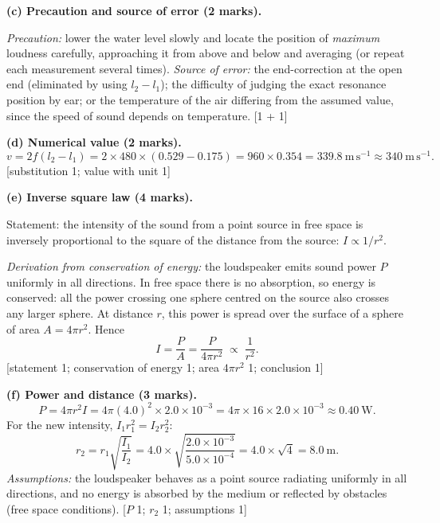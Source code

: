 \documentclass[11pt]{article}
\begin{document}
\begin{corrige}
\textbf{(c) Precaution and source of error (2 marks).}\par
\emph{Precaution:} lower the water level slowly and locate the position of \emph{maximum} loudness carefully, approaching it from above and below and averaging (or repeat each measurement several times). \emph{Source of error:} the end-correction at the open end (eliminated by using $l_{2}-l_{1}$); the difficulty of judging the exact resonance position by ear; or the temperature of the air differing from the assumed value, since the speed of sound depends on temperature. \hfill [1 + 1]

\textbf{(d) Numerical value (2 marks).}
\[ v = 2f(l_{2}-l_{1}) = 2\times 480\times(0.529 - 0.175) = 960\times 0.354 = 339.8\ \mathrm{m\,s^{-1}} \approx 340\ \mathrm{m\,s^{-1}}. \]
\hfill [substitution 1; value with unit 1]

\textbf{(e) Inverse square law (4 marks).}\par
Statement: the intensity of the sound from a point source in free space is inversely proportional to the square of the distance from the source: $I\propto 1/r^{2}$.\par
\emph{Derivation from conservation of energy:} the loudspeaker emits sound power $P$ uniformly in all directions. In free space there is no absorption, so energy is conserved: all the power crossing one sphere centred on the source also crosses any larger sphere. At distance $r$, this power is spread over the surface of a sphere of area $A = 4\pi r^{2}$. Hence
\[ I = \frac{P}{A} = \frac{P}{4\pi r^{2}} \;\propto\; \frac{1}{r^{2}}. \]
\hfill [statement 1; conservation of energy 1; area $4\pi r^{2}$ 1; conclusion 1]

\textbf{(f) Power and distance (3 marks).}
\[ P = 4\pi r^{2} I = 4\pi (4.0)^{2}\times 2.0\times10^{-3} = 4\pi\times 16\times 2.0\times10^{-3} \approx 0.40\ \mathrm{W}. \]
For the new intensity, $I_{1}r_{1}^{2} = I_{2}r_{2}^{2}$:
\[ r_{2} = r_{1}\sqrt{\frac{I_{1}}{I_{2}}} = 4.0\times\sqrt{\frac{2.0\times10^{-3}}{5.0\times10^{-4}}} = 4.0\times\sqrt{4} = 8.0\ \mathrm{m}. \]
\emph{Assumptions:} the loudspeaker behaves as a point source radiating uniformly in all directions, and no energy is absorbed by the medium or reflected by obstacles (free space conditions). \hfill [$P$ 1; $r_{2}$ 1; assumptions 1]
\end{corrige}
\end{document}
